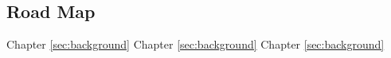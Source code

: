 \subsection{Road Map}

Chapter \ref{sec:background}
Chapter \ref{sec:background}
Chapter \ref{sec:background}